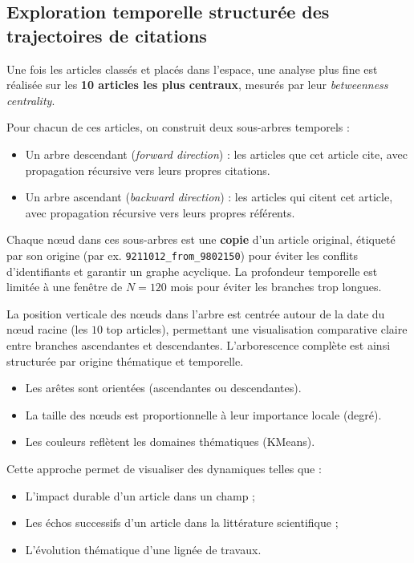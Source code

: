 \documentclass[12pt]{article}
\begin{document}
\subsection{Exploration temporelle structurée des trajectoires de citations}

Une fois les articles classés et placés dans l’espace, une analyse plus fine est réalisée sur les \textbf{10 articles les plus centraux}, mesurés par leur \textit{betweenness centrality}.

Pour chacun de ces articles, on construit deux sous-arbres temporels :
\begin{itemize}
    \item Un arbre descendant (\textit{forward direction}) : les articles que cet article cite, avec propagation récursive vers leurs propres citations.
    \item Un arbre ascendant (\textit{backward direction}) : les articles qui citent cet article, avec propagation récursive vers leurs propres référents.
\end{itemize}

Chaque nœud dans ces sous-arbres est une \textbf{copie} d’un article original, étiqueté par son origine (par ex. \texttt{9211012\_from\_9802150}) pour éviter les conflits d’identifiants et garantir un graphe acyclique. La profondeur temporelle est limitée à une fenêtre de $N=120$ mois pour éviter les branches trop longues.

La position verticale des nœuds dans l’arbre est centrée autour de la date du nœud racine (les $10$ top articles), permettant une visualisation comparative claire entre branches ascendantes et descendantes. L’arborescence complète est ainsi structurée par origine thématique et temporelle.

\begin{itemize}
    \item Les arêtes sont orientées (ascendantes ou descendantes).
    \item La taille des nœuds est proportionnelle à leur importance locale (degré).
    \item Les couleurs reflètent les domaines thématiques (KMeans).
\end{itemize}

Cette approche permet de visualiser des dynamiques telles que :
\begin{itemize}
    \item L'impact durable d’un article dans un champ ;
    \item Les échos successifs d’un article dans la littérature scientifique ;
    \item L’évolution thématique d’une lignée de travaux.
\end{itemize}
\end{document}
